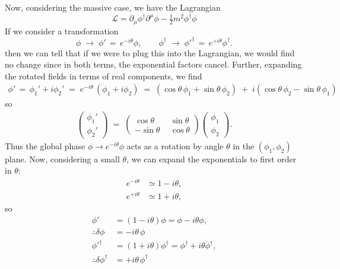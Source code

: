 \documentclass[12pt]{article}
\newcommand{\delmu}{\partial_{\mu}}
\newcommand{\delMu}{\partial^{\mu}}
\newcommand{\+}{\dagger}
\begin{document}
Now, considering the massive case, we have the Lagrangian
\begin{equation*}
   \mathcal{L} = \delmu\phi^{\dagger}\delMu\phi - \tfrac12 m^2 \phi^{\dagger}\phi
\end{equation*}
If we consider a transformation 
\begin{equation*}
   \phi \;\to\; \phi' \,=\, e^{-i\theta}\phi, \qquad
   \phi^\dagger \;\to\; \phi'^{\dagger} \,=\, e^{+i\theta}\phi^\dagger .
\end{equation*}
then we can tell that if we were to plug this into the Lagrangian, we would
find no change since in both terms, the exponential factors cancel. Further,
expanding the rotated fields in terms of real components, we find
\begin{align*}
   \phi' \,=\, \phi_1'+i\phi_2'
   \;=\; e^{-i\theta}\,(\phi_1+i\phi_2)
   \;=\; (\cos\theta\,\phi_1+\sin\theta\,\phi_2)
   \;+\; i(\cos\theta\,\phi_2-\sin\theta\,\phi_1)
\end{align*}
so
\begin{align*}
   \begin{pmatrix}\phi_1'\\ \phi_2'\end{pmatrix}
   \;=\;
   \begin{pmatrix}
      \cos\theta & \ \ \sin\theta \\
      -\sin\theta & \ \ \cos\theta
   \end{pmatrix}
   \begin{pmatrix}\phi_1\\ \phi_2\end{pmatrix}.
\end{align*}
Thus the global phase $\phi\to e^{-i\theta}\phi$ acts as a rotation by angle $\theta$ in the $(\phi_1,\phi_2)$ plane.
Now, considering a small $\theta$, we can expand the exponentials to first order in $\theta$:
\begin{align*}
   e^{-i\theta} &\simeq 1 - i\theta, \\
   e^{+i\theta} &\simeq 1 + i\theta,
\end{align*}
so
\begin{align*}
    \phi' &= (1 - i\theta)\phi = \phi - i\theta\phi, \\
   \therefore \delta\phi &= -i\theta\,\phi \\
   \phi'^{\dagger} &= (1 + i\theta)\phi^{\dagger} = \phi^{\dagger} + i\theta\phi^{\dagger}, \\
   \therefore \delta\phi^\dagger &= +i\theta\,\phi^\dagger
\end{align*}
\end{document}
